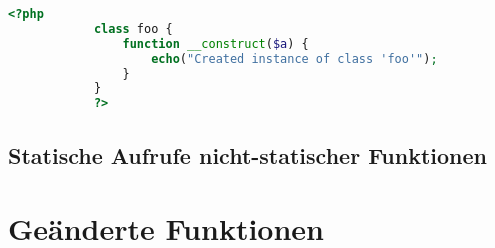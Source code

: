         \begin{lstlisting}[language=php, caption={Beispiel eines expliziten Konstruktors}, label={lst:php5construct}]
            <?php
            class foo {
                function __construct($a) {
                    echo("Created instance of class 'foo'");
                }
            }
            ?>
        \end{lstlisting}
    
    \subsection{Statische Aufrufe nicht-statischer Funktionen}

\section{Geänderte Funktionen}
